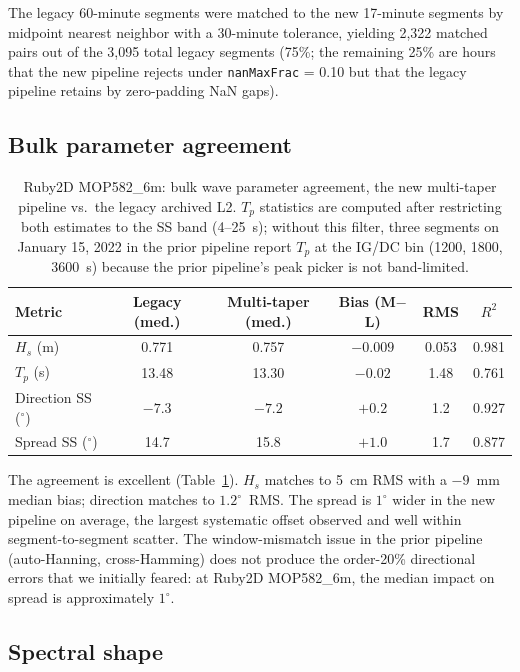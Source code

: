 \documentclass[11pt]{article}
\begin{document}
The legacy 60-minute segments were matched to the new 17-minute segments by
midpoint nearest neighbor with a 30-minute tolerance, yielding 2,322
matched pairs out of the 3,095 total legacy segments (75\%; the remaining
25\% are hours that the new pipeline rejects under
\texttt{nanMaxFrac} = 0.10 but that the legacy pipeline retains by
zero-padding NaN gaps).

\subsection{Bulk parameter agreement}

\begin{table}[htbp]
  \centering
  \caption{Ruby2D MOP582\_6m: bulk wave parameter agreement, the new
    multi-taper pipeline vs.\ the legacy archived L2. $T_p$ statistics
    are computed after restricting both estimates to the SS band
    (4--25~s); without this filter, three segments on January 15,
    2022 in the prior pipeline report $T_p$ at the IG/DC bin
    (1200, 1800, 3600~s) because the prior pipeline's peak picker is
    not band-limited.}
  \label{tab:ruby2d}
  \begin{tabular}{@{}lccccc@{}}
    \toprule
    Metric & Legacy (med.) & Multi-taper (med.) & Bias (M$-$L) & RMS & $R^2$ \\
    \midrule
    $H_s$ (m)             & 0.771  & 0.757  & $-0.009$ & 0.053 & 0.981 \\
    $T_p$ (s)             & 13.48  & 13.30  & $-0.02$  & 1.48  & 0.761 \\
    Direction SS ($^\circ$)    & $-7.3$ & $-7.2$ & $+0.2$   & 1.2   & 0.927 \\
    Spread SS ($^\circ$)       & 14.7   & 15.8   & $+1.0$   & 1.7   & 0.877 \\
    \bottomrule
  \end{tabular}
\end{table}

The agreement is excellent (Table~\ref{tab:ruby2d}). $H_s$ matches
to 5~cm RMS with a $-9$~mm median bias; direction matches to
$1.2^\circ$~RMS. The spread is $1^\circ$ wider in the new pipeline on
average, the largest systematic offset observed and well within
segment-to-segment scatter. The window-mismatch issue in the prior
pipeline (auto-Hanning, cross-Hamming) does not produce the
order-20\% directional errors that we initially feared: at Ruby2D
MOP582\_6m, the median impact on spread is approximately $1^\circ$.

\subsection{Spectral shape}
\end{document}
